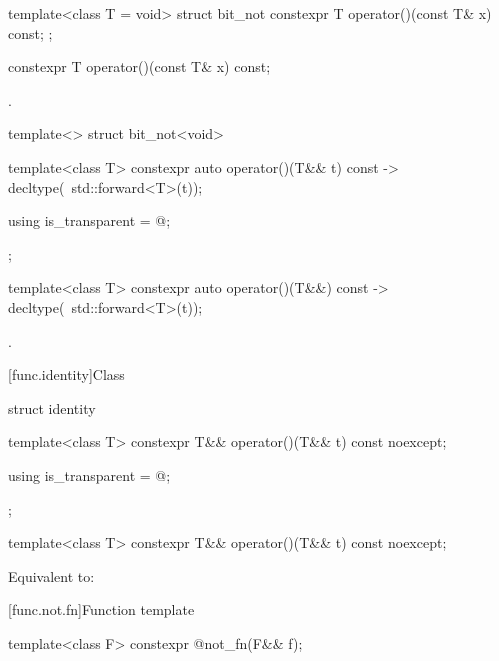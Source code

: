 \begin{itemdecl}
template<class T = void> struct bit_not {
  constexpr T operator()(const T& x) const;
};
\end{itemdecl}

%
\begin{itemdecl}
constexpr T operator()(const T& x) const;
\end{itemdecl}

\begin{itemdescr}
\pnum
\returns
{}.
\end{itemdescr}

\begin{indexed}{
%
}
\begin{itemdecl}
template<> struct bit_not<void> {
  template<class T> constexpr auto operator()(T&& t) const
    -> decltype(~std::forward<T>(t));

  using is_transparent = @\unspec@;
};
\end{itemdecl}
\end{indexed}

%
\begin{itemdecl}
template<class T> constexpr auto operator()(T&&) const
    -> decltype(~std::forward<T>(t));
\end{itemdecl}

\begin{itemdescr}
\pnum
\returns
{}.
\end{itemdescr}


[func.identity]{Class }

%
\begin{itemdecl}
struct identity {
  template<class T>
    constexpr T&& operator()(T&& t) const noexcept;

  using is_transparent = @\unspec@;
};

template<class T>
  constexpr T&& operator()(T&& t) const noexcept;
\end{itemdecl}

\begin{itemdescr}
\pnum
\effects
Equivalent to: 
\end{itemdescr}


[func.not.fn]{Function template }

%
\begin{itemdecl}
template<class F> constexpr @\unspec@ not_fn(F&& f);
\end{itemdecl}

